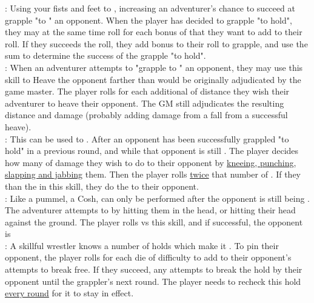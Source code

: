 \begin{multicols*}{2}
{:  Using your fists and feet to , increasing an adventurer's chance to succeed at grapple "to " an opponent. When the player has decided to grapple "to hold", they may at the same time roll  for each bonus of  that they want to add to their  roll. If they succeeds the roll, they add bonus to their  roll to grapple, and use the sum to determine the success of the grapple "to hold". \\

: When an adventurer attempts to "grapple to " an opponent, they may use this skill to Heave the opponent farther than would be originally adjudicated by the game master. The player rolls  for each additional  of distance they wish their adventurer to heave their opponent. The GM still adjudicates the resulting distance and damage (probably adding damage from a fall from a successful heave).\\

: This can be used to . After an opponent has been successfully grappled "to hold" in a previous round, and while that opponent is still . The player decides how many  of damage they wish to do to their opponent by \ul{kneeing, punching, slapping and jabbing} them. Then the player rolls \ul{twice} that number of . If they  than the  in this skill, they do the  to their opponent.\\

: Like a pummel, a Cosh, can only be performed after the opponent is still being . The adventurer attempts to  by hitting them in the head, or hitting their head against the ground. The player rolls  vs this skill, and if successful, the opponent is \\

: A skillful wrestler knows a number of holds which make it . To pin their opponent, the player rolls  for each die of difficulty to add to their opponent's attempts to break free. If they succeed, any attempts to break the hold by their opponent  until the grappler's next round. The player needs to recheck this hold \ul{every round} for it to stay in effect.\\

}
\end{multicols*}
